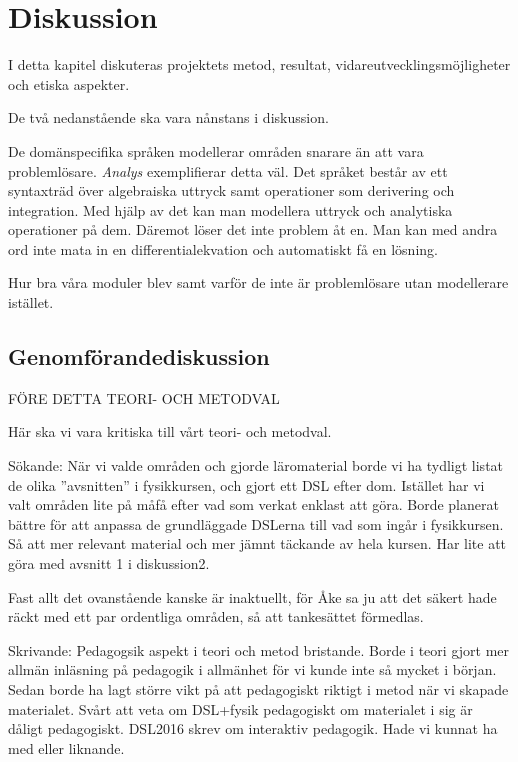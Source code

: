 
\chapter{Diskussion}

\begin{draft}

I detta kapitel diskuteras projektets metod, resultat,
vidareutvecklingsmöjligheter och etiska aspekter.

\end{draft}

\begin{binge}

De två nedanstående ska vara nånstans i diskussion.

De domänspecifika språken modellerar områden snarare än att vara problemlösare.
\textit{Analys} exemplifierar detta väl. Det språket består av ett syntaxträd
över algebraiska uttryck samt operationer som derivering och integration. Med
hjälp av det kan man modellera uttryck och analytiska operationer på dem.
Däremot löser det inte problem åt en. Man kan med andra ord inte mata in en
differentialekvation och automatiskt få en lösning.

Hur bra våra moduler blev samt varför de inte är problemlösare utan modellerare
istället.

\section{Genomförandediskussion}

FÖRE DETTA TEORI- OCH METODVAL

Här ska vi vara kritiska till vårt teori- och metodval.

Sökande: När vi valde områden och gjorde läromaterial borde vi ha tydligt listat
de olika ''avsnitten'' i fysikkursen, och gjort ett DSL efter dom. Istället har
vi valt områden lite på måfå efter vad som verkat enklast att göra. Borde
planerat bättre för att anpassa de grundläggade DSLerna till vad som ingår i
fysikkursen. Så att mer relevant material och mer jämnt täckande av hela kursen.
Har lite att göra med avsnitt 1 i diskussion2.

Fast allt det ovanstående kanske är inaktuellt, för Åke sa ju att det säkert
hade räckt med ett par ordentliga områden, så att tankesättet förmedlas.

Skrivande: Pedagogsik aspekt i teori och metod bristande. Borde i teori gjort
mer allmän inläsning på pedagogik i allmänhet för vi kunde inte så mycket i
början. Sedan borde ha lagt större vikt på att pedagogiskt riktigt i metod när
vi skapade materialet. Svårt att veta om DSL+fysik pedagogiskt om materialet i
sig är dåligt pedagogiskt. DSL2016 skrev om interaktiv pedagogik. Hade vi kunnat
ha med eller liknande.


\end{binge}

